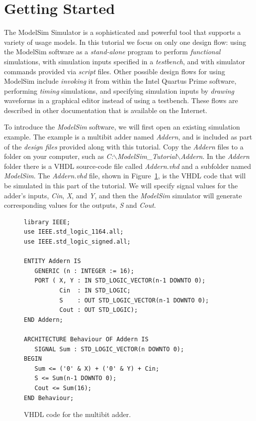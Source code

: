 \documentclass[11pt, twoside, pdftex]{article}
\begin{document}
\clearpage
\newpage
\section{Getting Started}

The ModelSim Simulator is a sophisticated and powerful tool that supports a variety of 
usage models. In this tutorial we focus on only one design flow: using the ModelSim
software as a {\it stand-alone} program to perform {\it functional} simulations, with 
simulation inputs specified in a {\it testbench}, and with simulator commands provided 
via {\it script} files. Other possible design flows for using ModelSim include {\it invoking}
it from within the Intel Quartus Prime software, performing {\it timing} simulations, and
specifying simulation inputs by {\it drawing} waveforms in a graphical editor instead of
using a testbench. These flows are described in other
documentation that is available on the Internet.  

\noindent
To introduce the {\it ModelSim} software, we will first open an existing simulation example.
The example is a multibit adder named {\it Addern}, and is included as 
part of the {\it design files} provided
along with this tutorial. Copy the {\it Addern} files to a folder on your computer, such
as {\it C:$\backslash$ModelSim\_Tutorial$\backslash$Addern}. In the {\it Addern} folder
there is a VHDL source-code file called {\it Addern.vhd} and a subfolder named {\it ModelSim}.
The {\it Addern.vhd} file, shown in Figure~\ref{fig:addern}, is the VHDL code that will 
be simulated in this part of the tutorial. We will specify signal 
values for the adder's inputs, {\it Cin}, {\it X}, and {\it Y}, and then the {\it
ModelSim} simulator will generate corresponding values for the outputs, {\it S} and {\it Cout}.

\lstset{language=VHDL,numbers=none,escapechar=|}
\begin{figure}[h]
\begin{center}
\begin{minipage}[t]{12.5 cm}
\begin{lstlisting}[name=addern]
library IEEE;
use IEEE.std_logic_1164.all;
use IEEE.std_logic_signed.all;

ENTITY Addern IS 
   GENERIC (n : INTEGER := 16);
   PORT ( X, Y : IN STD_LOGIC_VECTOR(n-1 DOWNTO 0);
          Cin  : IN STD_LOGIC;
          S    : OUT STD_LOGIC_VECTOR(n-1 DOWNTO 0);
          Cout : OUT STD_LOGIC);
END Addern;

ARCHITECTURE Behaviour OF Addern IS 
   SIGNAL Sum : STD_LOGIC_VECTOR(n DOWNTO 0);
BEGIN 
   Sum <= ('0' & X) + ('0' & Y) + Cin;
   S <= Sum(n-1 DOWNTO 0);
   Cout <= Sum(16);
END Behaviour;
\end{lstlisting}
\end{minipage}
\caption{VHDL code for the multibit adder.}
\label{fig:addern}
\end{center}
\end{figure}
\end{document}
